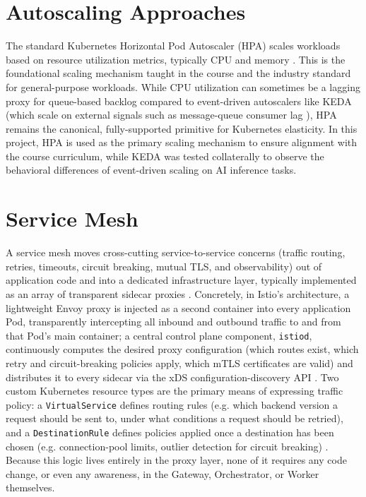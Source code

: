 \documentclass[twoside]{supsistudent}
\begin{document}
\section{Autoscaling Approaches}
The standard Kubernetes Horizontal Pod Autoscaler (HPA) scales workloads based on resource utilization metrics, typically CPU and memory \cite{cncf2022keda, datadog2026scaling}. This is the foundational scaling mechanism taught in the course and the industry standard for general-purpose workloads. While CPU utilization can sometimes be a lagging proxy for queue-based backlog compared to event-driven autoscalers like KEDA (which scale on external signals such as message-queue consumer lag \cite{roubalik2022keda}), HPA remains the canonical, fully-supported primitive for Kubernetes elasticity. In this project, HPA is used as the primary scaling mechanism to ensure alignment with the course curriculum, while KEDA was tested collaterally to observe the behavioral differences of event-driven scaling on AI inference tasks.

\section{Service Mesh}
A service mesh moves cross-cutting service-to-service concerns (traffic routing, retries, timeouts, circuit breaking, mutual TLS, and observability) out of application code and into a dedicated infrastructure layer, typically implemented as an array of transparent sidecar proxies \cite{morgan2017service, devopscon2019service}. Concretely, in Istio's architecture, a lightweight Envoy proxy is injected as a second container into every application Pod, transparently intercepting all inbound and outbound traffic to and from that Pod's main container; a central control plane component, \texttt{istiod}, continuously computes the desired proxy configuration (which routes exist, which retry and circuit-breaking policies apply, which mTLS certificates are valid) and distributes it to every sidecar via the xDS configuration-discovery API \cite{istio-traffic, istio-virtualservice, istio-destinationrule}. Two custom Kubernetes resource types are the primary means of expressing traffic policy: a \texttt{VirtualService} defines routing rules (e.g. which backend version a request should be sent to, under what conditions a request should be retried), and a \texttt{DestinationRule} defines policies applied once a destination has been chosen (e.g. connection-pool limits, outlier detection for circuit breaking) \cite{istio-traffic, istio-virtualservice, istio-destinationrule}. Because this logic lives entirely in the proxy layer, none of it requires any code change, or even any awareness, in the Gateway, Orchestrator, or Worker themselves.
\end{document}
